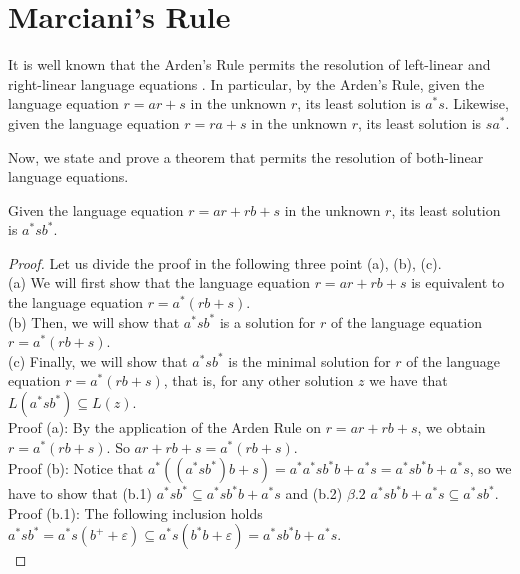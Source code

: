 \section{Marciani's Rule}
\label{sec:marciani-rule}

It is well known that the Arden's Rule permits the resolution of left-linear and right-linear language equations \cite{Pettorossi13}.
In particular, by the Arden's Rule, given the language equation $r=ar+s$ in the unknown $r$, its least solution is $a^{*}s$. Likewise, given the language equation $r=ra+s$ in the unknown $r$, its least solution is $sa^{*}$. 

Now, we state and prove a theorem that permits the resolution of both-linear language equations.

\begin{theorem}
	\label{thm:marciani-rule}
	
	Given the language equation $r=ar+rb+s$ in the unknown $r$, its least solution is $a^{*}sb^{*}$.
	
	\begin{proof}
		Let us divide the proof in the following three point (a), (b), (c).
		\\
		(a) We will first show that the language equation $r=ar+rb+s$ is equivalent to the language equation $r=a^{*}(rb+s)$. \\
		(b) Then, we will show that $a^{*}sb^{*}$ is a solution for $r$ of the language equation $r=a^{*}(rb+s)$. \\
		(c) Finally, we will show that $a^{*}sb^{*}$ is the minimal solution for $r$ of the language equation $r=a^{*}(rb+s)$, that is, for
		any other solution $z$ we have that $L(a^{*}sb^{*})\subseteq L(z)$.\\
		
		Proof (a): By the application of the Arden Rule on $r=ar+rb+s$, we obtain $r=a^{*}(rb+s)$. 
		So $ar+rb+s=a^{*}(rb+s)$\cite{Pettorossi13}.\\
		
		Proof (b): Notice that $a^{*}((a^{*}sb^{*})b+s)=a^{*}a^{*}sb^{*}b+a^{*}s=a^{*}sb^{*}b+a^{*}s$,
		so we have to show that 
		(b.1) $a^{*}sb^{*}\subseteq a^{*}sb^{*}b+a^{*}s$ and 
		(b.2) $\beta.2$ $a^{*}sb^{*}b+a^{*}s\subseteq a^{*}sb^{*}$.\\
		
		Proof (b.1): The following inclusion holds 
		$a^{*}sb^{*}=a^{*}s(b^{+}+\varepsilon)\subseteq  a^{*}s(b^{*}b+\varepsilon)=a^{*}sb^{*}b+a^{*}s$.\\
		

\end{proof}
\end{theorem}
